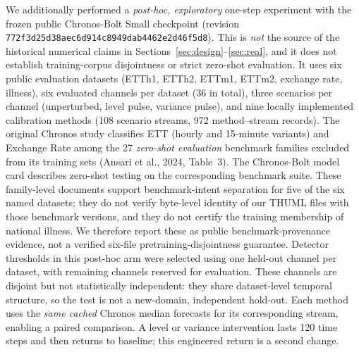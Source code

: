 \documentclass[10pt]{article}
\begin{document}
We additionally performed a \emph{post-hoc, exploratory} one-step experiment
with the frozen public Chronos-Bolt Small checkpoint
(revision \texttt{772f3d25d38aec6d914c8949dab4462e2d46f5d8}). This is
\emph{not} the source of the historical numerical claims in
Sections~\ref{sec:design}--\ref{sec:real}, and it does not establish
training-corpus disjointness or strict zero-shot evaluation. It uses
six public evaluation datasets (ETTh1, ETTh2, ETTm1, ETTm2, exchange
rate, illness), six evaluated channels per dataset (36 in total),
three scenarios per channel (unperturbed, level pulse, variance pulse),
and nine locally implemented calibration methods (108 scenario streams,
972 method--stream records). The original Chronos study classifies ETT
(hourly and 15-minute variants) and Exchange Rate among the 27
\emph{zero-shot evaluation} benchmark families excluded from its
training sets (Ansari et al., 2024, Table~3). The Chronos-Bolt model
card describes zero-shot testing on the corresponding benchmark suite.
These family-level documents support benchmark-intent separation for
five of the six named datasets; they do not verify byte-level identity
of our THUML files with those benchmark versions, and they do not
certify the training membership of national illness. We therefore
report these as public benchmark-provenance evidence, not a verified
six-file pretraining-disjointness guarantee. Detector thresholds in this
post-hoc arm were selected using one held-out channel per dataset, with
remaining channels reserved for evaluation. These channels are disjoint
but not statistically independent: they share dataset-level temporal
structure, so the test is not a new-domain, independent hold-out. Each
method uses the \emph{same cached}
Chronos median forecasts for its corresponding stream, enabling a
paired comparison. A level or variance intervention lasts 120 time steps
and then returns to baseline; this engineered return is a second change.
\end{document}
